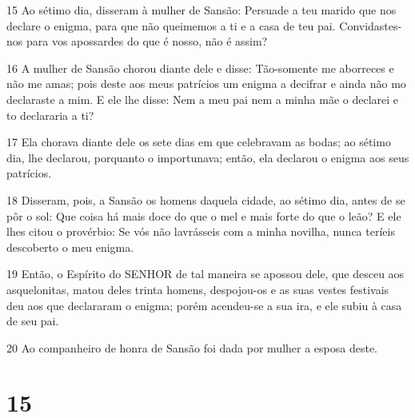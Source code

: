 \par 15 Ao sétimo dia, disseram à mulher de Sansão: Persuade a teu marido que nos declare o enigma, para que não queimemos a ti e a casa de teu pai. Convidastes-nos para vos apossardes do que é nosso, não é assim?
\par 16 A mulher de Sansão chorou diante dele e disse: Tão-somente me aborreces e não me amas; pois deste aos meus patrícios um enigma a decifrar e ainda não mo declaraste a mim. E ele lhe disse: Nem a meu pai nem a minha mãe o declarei e to declararia a ti?
\par 17 Ela chorava diante dele os sete dias em que celebravam as bodas; ao sétimo dia, lhe declarou, porquanto o importunava; então, ela declarou o enigma aos seus patrícios.
\par 18 Disseram, pois, a Sansão os homens daquela cidade, ao sétimo dia, antes de se pôr o sol: Que coisa há mais doce do que o mel e mais forte do que o leão? E ele lhes citou o provérbio: Se vós não lavrásseis com a minha novilha, nunca teríeis descoberto o meu enigma.
\par 19 Então, o Espírito do SENHOR de tal maneira se apossou dele, que desceu aos asquelonitas, matou deles trinta homens, despojou-os e as suas vestes festivais deu aos que declararam o enigma; porém acendeu-se a sua ira, e ele subiu à casa de seu pai.
\par 20 Ao companheiro de honra de Sansão foi dada por mulher a esposa deste.

\chapter{15}

